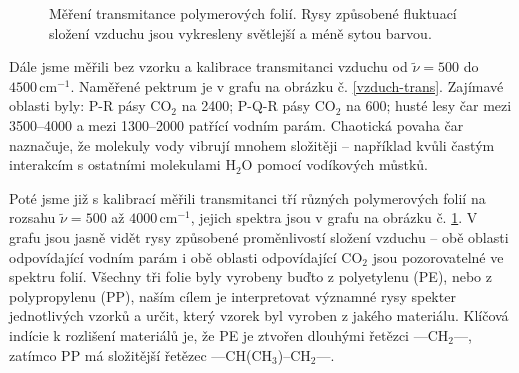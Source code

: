 \documentclass[10pt,a4paper]{article}
\renewcommand{\U}[1]{\ensuremath{\,\mathrm{#1}}}
\newcommand{\°}{\degree}
\begin{document}
\begin{figure}[p]
    \caption{Měření transmitance polymerových folií. Rysy způsobené fluktuací složení vzduchu jsou vykresleny světlejší a méně sytou barvou.}
    \label{pol-trans}
\end{figure}

Dále jsme měřili bez vzorku a kalibrace transmitanci vzduchu od $\tilde\nu = 500$ do $4500 \U{cm^{-1}}$. Naměřené pektrum je v grafu na obrázku č. \ref{vzduch-trans}. Zajímavé oblasti byly: P-R pásy CO$_2$ na 2400; P-Q-R pásy CO$_2$ na 600; husté lesy čar mezi 3500--4000 a mezi 1300--2000 patřící vodním parám. Chaotická povaha čar naznačuje, že molekuly vody vibrují mnohem složitěji – například kvůli častým interakcím s ostatními molekulami H$_2$O pomocí vodíkových můstků.

Poté jsme již s kalibrací měřili transmitanci tří různých polymerových folií na rozsahu $\tilde\nu = 500$ až $4000 \U{cm^{-1}}$, jejich spektra jsou v grafu na obrázku č. \ref{pol-trans}. V grafu jsou jasně vidět rysy způsobené proměnlivostí složení vzduchu – obě oblasti odpovídající vodním parám i obě oblasti odpovídající CO$_2$ jsou pozorovatelné ve spektru folií. Všechny tři folie byly vyrobeny buďto z polyetylenu (PE), nebo z polypropylenu (PP), naším cílem je interpretovat významné rysy spekter jednotlivých vzorků a určit, který vzorek byl vyroben z jakého materiálu. Klíčová indície k rozlišení materiálů je, že PE je ztvořen dlouhými řetězci —CH$_2$—, zatímco PP má složitější řetězec —CH(CH$_3$)–CH$_2$—.
\end{document}
